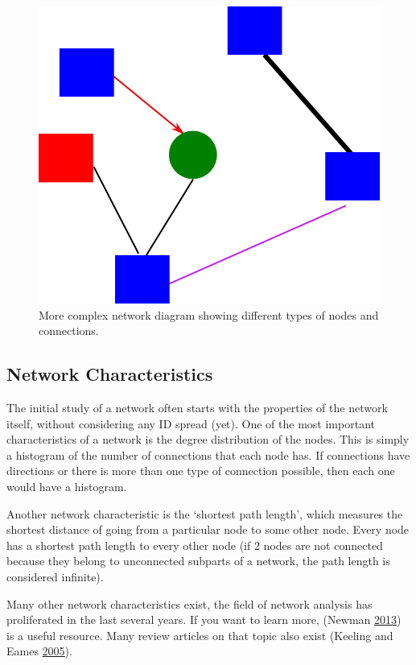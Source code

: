 \documentclass[]{article}
\theoremstyle{definition}
\theoremstyle{definition}
\theoremstyle{definition}
\theoremstyle{remark}
\begin{document}
\begin{figure}
\centering
\includegraphics{./images/complex-network-diagram.png}
\caption{More complex network diagram showing different types of nodes
and connections.}
\end{figure}

\subsection{Network Characteristics}\label{network-characteristics}

The initial study of a network often starts with the properties of the
network itself, without considering any ID spread (yet). One of the most
important characteristics of a network is the degree distribution of the
nodes. This is simply a histogram of the number of connections that each
node has. If connections have directions or there is more than one type
of connection possible, then each one would have a histogram.

Another network characteristic is the `shortest path length', which
measures the shortest distance of going from a particular node to some
other node. Every node has a shortest path length to every other node
(if 2 nodes are not connected because they belong to unconnected
subparts of a network, the path length is considered infinite).

Many other network characteristics exist, the field of network analysis
has proliferated in the last several years. If you want to learn more,
(Newman \protect\hyperlink{ref-newman13}{2013}) is a useful resource.
Many review articles on that topic also exist (Keeling and Eames
\protect\hyperlink{ref-keeling05}{2005}).
\end{document}
